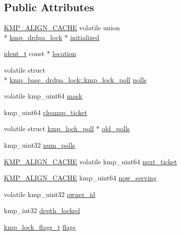 \subsection*{Public Attributes}
\begin{DoxyCompactItemize}
\item 
\hyperlink{kmp__os_8h_a6830c178a3906c25cd0138d8365db070}{K\-M\-P\-\_\-\-A\-L\-I\-G\-N\-\_\-\-C\-A\-C\-H\-E} volatile union \\*
\hyperlink{unionkmp__drdpa__lock}{kmp\-\_\-drdpa\-\_\-lock} $\ast$ \hyperlink{structkmp__base__drdpa__lock_a92a265553be821abfabdb1c68f70b70b}{initialized}
\item 
\hyperlink{group__BASIC__TYPES_ga690fda6b92f039a72db263c6b4394ddb}{ident\-\_\-t} const $\ast$ \hyperlink{structkmp__base__drdpa__lock_aab9a244dfedf0a444df2955caff8ea7f}{location}
\item 
volatile struct \\*
\hyperlink{structkmp__base__drdpa__lock_1_1kmp__lock__poll}{kmp\-\_\-base\-\_\-drdpa\-\_\-lock\-::kmp\-\_\-lock\-\_\-poll} \hyperlink{structkmp__base__drdpa__lock_a593b095d74a879395f66298a78b97f44}{polls}
\item 
volatile kmp\-\_\-uint64 \hyperlink{structkmp__base__drdpa__lock_acec09bcec7dbfc7df0ed9a06e61f3bcf}{mask}
\item 
kmp\-\_\-uint64 \hyperlink{structkmp__base__drdpa__lock_a6b95d65ec5cc5135a0eed70eafdc11ed}{cleanup\-\_\-ticket}
\item 
volatile struct \hyperlink{structkmp__base__drdpa__lock_1_1kmp__lock__poll}{kmp\-\_\-lock\-\_\-poll} $\ast$ \hyperlink{structkmp__base__drdpa__lock_a1debd4e500c7c07e8943125d5d230555}{old\-\_\-polls}
\item 
kmp\-\_\-uint32 \hyperlink{structkmp__base__drdpa__lock_aae7fd55506d696cd2e4aaf509c90bd08}{num\-\_\-polls}
\item 
\hyperlink{kmp__os_8h_a6830c178a3906c25cd0138d8365db070}{K\-M\-P\-\_\-\-A\-L\-I\-G\-N\-\_\-\-C\-A\-C\-H\-E} volatile kmp\-\_\-uint64 \hyperlink{structkmp__base__drdpa__lock_ad785a638373622c2eb3fb47dc9da66ce}{next\-\_\-ticket}
\item 
\hyperlink{kmp__os_8h_a6830c178a3906c25cd0138d8365db070}{K\-M\-P\-\_\-\-A\-L\-I\-G\-N\-\_\-\-C\-A\-C\-H\-E} kmp\-\_\-uint64 \hyperlink{structkmp__base__drdpa__lock_a5b614d7eb0d32b3ce7e9412aa6ac24d6}{now\-\_\-serving}
\item 
volatile kmp\-\_\-uint32 \hyperlink{structkmp__base__drdpa__lock_a941e91e161836331e4107e447c360fea}{owner\-\_\-id}
\item 
kmp\-\_\-int32 \hyperlink{structkmp__base__drdpa__lock_a8ab4634e1e61fe099058e01b2be89482}{depth\-\_\-locked}
\item 
\hyperlink{kmp__lock_8h_aa9a2d4f195809e8574655b5eda034db7}{kmp\-\_\-lock\-\_\-flags\-\_\-t} \hyperlink{structkmp__base__drdpa__lock_a9307a08687874c5ba8ad3ac355945ac7}{flags}
\end{DoxyCompactItemize}


